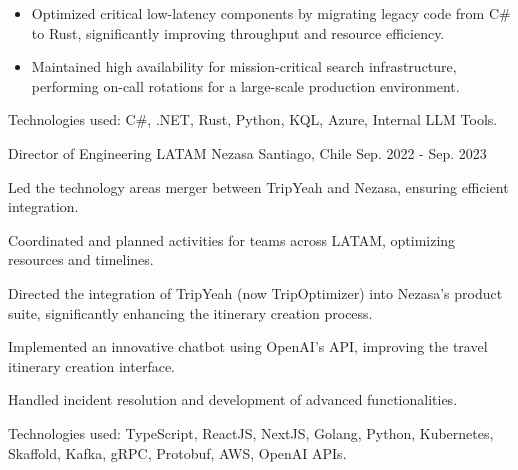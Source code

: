 \begin{cventries}
{\begin{cvitems}
{\begin{itemize}
                \item {Optimized critical low-latency components by migrating legacy code from C\# to Rust, significantly improving throughput and resource efficiency.}
                \item {Maintained high availability for mission-critical search infrastructure, performing on-call rotations for a large-scale production environment.}
              \end{itemize}
            }
            \item {Technologies used: C\#, .NET, Rust, Python, KQL, Azure, Internal LLM Tools.}
        \end{cvitems}
    }
  \cventry
    {Director of Engineering LATAM} %
    {Nezasa} %
    {Santiago, Chile} %
    {Sep. 2022 - Sep. 2023} %
    {
      \begin{cvitems} %
        \item {Led the technology areas merger between TripYeah and Nezasa, ensuring efficient integration.}
        \item {Coordinated and planned activities for teams across LATAM, optimizing resources and timelines.}
        \item {Directed the integration of TripYeah (now TripOptimizer) into Nezasa's product suite, significantly enhancing the itinerary creation process.}
        \item {Implemented an innovative chatbot using OpenAI's API, improving the travel itinerary creation interface.}
        \item {Handled incident resolution and development of advanced functionalities.}
        \item {Technologies used: TypeScript, ReactJS, NextJS, Golang, Python, Kubernetes, Skaffold, Kafka, gRPC, Protobuf, AWS, OpenAI APIs.}
      \end{cvitems}
    }


\end{cventries}
